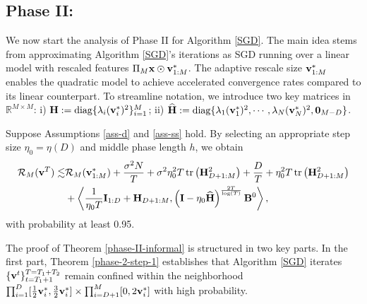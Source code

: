 \subsection{Phase II:}
We now start the analysis  of  Phase II for Algorithm \ref{SGD}.  The main idea stems from approximating Algorithm \ref{SGD}'s iterations as SGD %
running over a linear model  with rescaled features $\Pi_M\mathbf{x}\odot\mathbf{v}_{1:M}^*$. The adaptive rescale size $\mathbf{v}_{1:M}^*$
enables the quadratic model to achieve accelerated convergence rates compared to its linear counterpart. To streamline notation, we introduce two key matrices in $\mathbb{R}^{M\times M}$: 
i) $\mathbf{H} := \operatorname*{diag}\{\lambda_i(\mathbf{v}_i^*)^2\}_{i=1}^M$; ii) $\widehat{\mathbf{H}} := \operatorname*{diag}\{\lambda_1(\mathbf{v}_1^*)^2, \cdots, \lambda_N(\mathbf{v}_N^*)^2, \textbf{0}_{M-D}\}$.
\begin{theorem}\label{phase-II-informal}
    Suppose Assumptions \ref{ass-d} and  \ref{ass-ss} hold. By selecting an appropriate step size $\eta_0=\eta(D)$ and middle phase length $h$, we obtain
    \begin{equation}
        \begin{split}
            \mathcal{R}_{M}(\mathbf{v}^T)\lesssim&\mathcal{R}_{M}(\mathbf{v}_{1:M}^*)+\frac{\sigma^2N}{T}+\sigma^2\eta_0^2 T\operatorname*{tr}\left(\mathbf{H}_{D+1:M}^2\right)+\frac{D}{T}+\eta_0^2T\operatorname*{tr}\left(\mathbf{H}_{D+1:M}^2\right)
        \\
        &+\left\langle\frac{1}{\eta_0 T}\mathbf{I}_{1:D}+\mathbf{H}_{D+1:M},\left(\mathbf{I}-\eta_0\widehat{\mathbf{H}}\right)^{\frac{2T}{\log(T)}}\mathbf{B}^0\right\rangle,\notag
        \end{split}
    \end{equation}
    with probability at least 0.95.
\end{theorem}
The proof of Theorem \ref{phase-II-informal} is structured in two key parts. In the first part, Theorem \ref{phase-2-step-1} establishes that Algorithm \ref{SGD} iterates $\{\mathbf{v}^t\}_{t=T_1+1}^{T=T_1+T_2}$ remain confined within the neighborhood $\prod_{i=1}^D[\frac{1}{2}\mathbf{v}_i^*,\frac{3}{2}\mathbf{v}_i^*]\times\prod_{i=D+1}^M[0,2\mathbf{v}_i^*]$ with high probability. 
